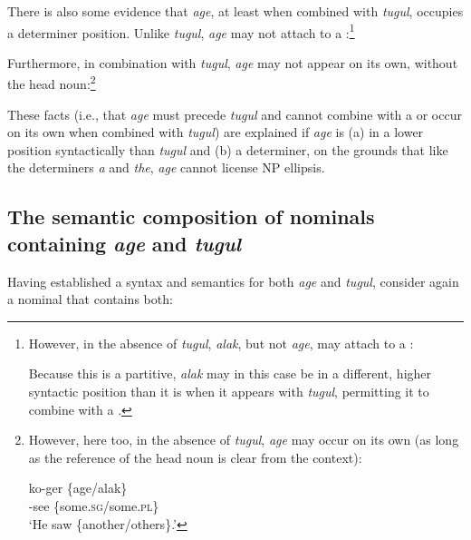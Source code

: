 \documentclass[output=paper,newtxmath,modfonts,nonflat,hidelinks]{langsci/langscibook}
\begin{document}
There is also some evidence that \textit{age}, at least when combined with \textit{tugul}, occupies a determiner position. Unlike \textit{tugul}, \textit{age} may not attach to a :\footnote{However, in the absence of \textit{tugul}, \textit{alak}, but not \textit{age}, may attach to a :

\z 

 \noindent Because this is a partitive, \textit{alak} may in this case be in a different, higher syntactic position than it is when it appears with \textit{tugul}, permitting it to combine with a .}

\z

 Furthermore, in combination with \textit{tugul}, \textit{age} may not appear on its own, without the head noun:\footnote{However, here too, in the absence of \textit{tugul}, \textit{age} may occur on its own (as long as the reference of the head noun is clear from the context):

\ea\label{ex:agetugulonown}
    \gll ko-ger \{age/alak\}\\ 
	     {\PST}-see \{some.\textsc{sg}/some.\textsc{pl}\} \\
     \glt ‘He saw \{another/others\}.’   
     \z }

\z 

These facts (i.e., that \textit{age} must precede \textit{tugul} and cannot combine with a  or occur on its own when combined with \textit{tugul}) are explained if \textit{age} is (a) in a lower position syntactically than \textit{tugul} and (b) a determiner, on the grounds that like the  determiners \textit{a} and \textit{the}, \textit{age} cannot license NP ellipsis.

\subsection{The semantic composition of nominals containing \textit{age} and \textit{tugul}}
Having established a syntax and semantics for both \textit{age} and \textit{tugul}, consider again a nominal that contains both:
\end{document}
